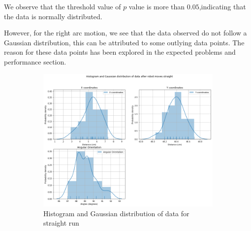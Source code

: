\documentclass[10pt,a4paper]{article}
\begin{document}
			We observe that the threshold value of $p$ value is more than $0.05$,indicating that the data is normally distributed.
			
			However, for the right arc motion, we see that the data observed do not follow a Gaussian distribution, this can be attributed to some outlying data points. The reason for these data points has been explored in the expected problems and performance section.
			
			 \begin{figure}[H]
			 	\begin{subfigure}{\textwidth}
			 		\centering
			 		\includegraphics[width=\linewidth]{img/histplot_st.png}
			 		\caption{Histogram and Gaussian distribution of data for straight run}
			 	\end{subfigure}
			 	\caption{}%
			 \end{figure}
\end{document}
